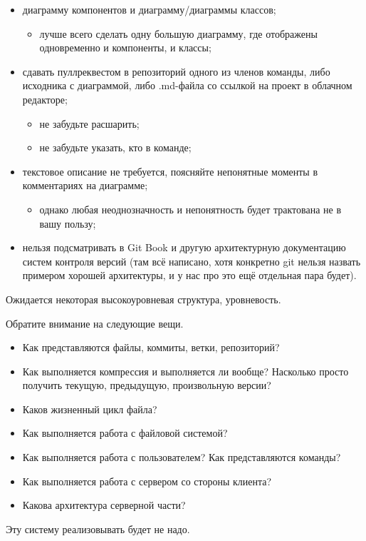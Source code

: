 \documentclass[a5paper]{article}
\begin{document}
\begin{itemize}
    \item диаграмму компонентов и диаграмму/диаграммы классов;
    \begin{itemize}
        \item лучше всего сделать одну большую диаграмму, где отображены одновременно и компоненты, и классы;
    \end{itemize}
    \item сдавать пуллреквестом в репозиторий одного из членов команды, либо исходника с диаграммой, либо .md-файла со ссылкой на проект в облачном редакторе;
    \begin{itemize}
        \item не забудьте расшарить;
        \item не забудьте указать, кто в команде;
    \end{itemize}
    \item текстовое описание не требуется, поясняйте непонятные моменты в комментариях на диаграмме;
    \begin{itemize}
        \item однако любая неоднозначность и непонятность будет трактована не в вашу пользу;
    \end{itemize}
    \item нельзя подсматривать в Git Book и другую архитектурную документацию систем контроля версий (там всё написано, хотя конкретно git нельзя назвать примером хорошей архитектуры, и у нас про это ещё отдельная пара будет).
\end{itemize}

Ожидается некоторая высокоуровневая структура, уровневость.

Обратите внимание на следующие вещи.

\begin{itemize}
    \item Как представляются файлы, коммиты, ветки, репозиторий?
    \item Как выполняется компрессия и выполняется ли вообще? Насколько просто получить текущую, предыдущую, произвольную версии?
    \item Каков жизненный цикл файла?
    \item Как выполняется работа с файловой системой?
    \item Как выполняется работа с пользователем? Как представляются команды?
    \item Как выполняется работа с сервером со стороны клиента?
    \item Какова архитектура серверной части?
\end{itemize}

Эту систему реализовывать будет не надо.
\end{document}
